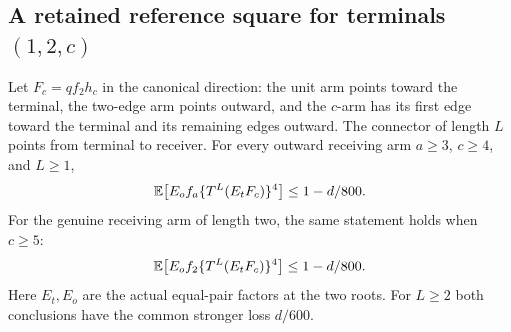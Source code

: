 \subsection{A retained reference square for terminals $(1,2,c)$}
\label{proof:Q5-C184}
\begin{proposition}\label{prop:retained-reference-family}
Let $F_c=qf_2h_c$ in the canonical direction: the unit arm points
toward the terminal, the two-edge arm points outward, and the $c$-arm
has its first edge toward the terminal and its remaining edges outward.
The connector of length $L$ points from terminal to receiver.
For every outward receiving arm $a\ge3$, $c\ge4$, and $L\ge1$,
\begin{equation}\label{eq:Q184:scope}
 \mathbb E\bigl[E_of_a\{T^L(E_tF_c)\}^4\bigr]\le1-d/800.
\end{equation}
For the genuine receiving arm of length two, the same statement holds
when $c\ge5$:
\begin{equation}\label{eq:Q184:f2-extension}
 \mathbb E\bigl[E_of_2\{T^L(E_tF_c)\}^4\bigr]\le1-d/800.
\end{equation}
Here $E_t,E_o$ are the actual equal-pair factors at the two roots.
For $L\ge2$ both conclusions have the common stronger loss $d/600$.
\end{proposition}

